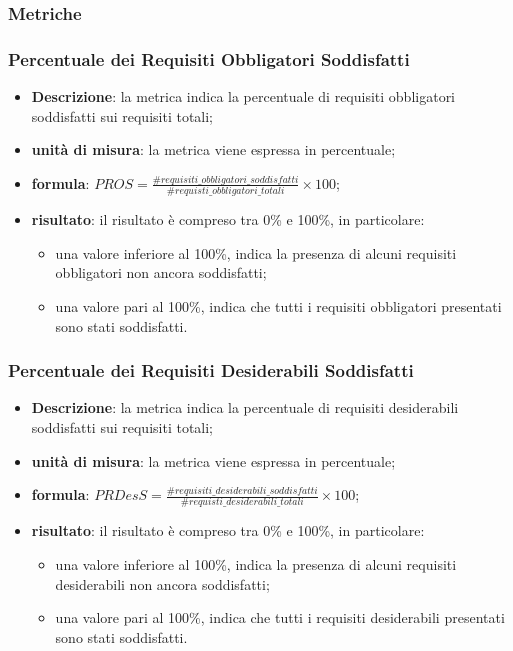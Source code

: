 \subsubsection{Metriche}
		\subsubsection*{Percentuale dei Requisiti Obbligatori Soddisfatti}
			\begin{itemize}
				\item{\textbf{Descrizione}}: la metrica indica la percentuale di requisiti obbligatori soddisfatti sui requisiti totali;
				\item{\textbf{unità di misura}}: la metrica viene espressa in percentuale;
				\item{\textbf{formula}}: $ PROS = \displaystyle\frac{\#requisiti\_obbligatori\_soddisfatti}{\#requisti\_obbligatori\_totali}\times100$;
				\item{\textbf{risultato}}: il risultato è compreso tra 0\% e 100\%, in particolare:
					\begin{itemize}
						\item una valore inferiore al 100\%, indica la presenza di alcuni requisiti obbligatori non ancora soddisfatti;
						\item una valore pari al 100\%, indica che tutti i requisiti obbligatori presentati sono stati soddisfatti.
					\end{itemize}
			\end{itemize}
		
		\subsubsection*{Percentuale dei Requisiti Desiderabili Soddisfatti}
			\begin{itemize}
				\item{\textbf{Descrizione}}: la metrica indica la percentuale di requisiti desiderabili soddisfatti sui requisiti totali;
				\item{\textbf{unità di misura}}: la metrica viene espressa in percentuale;
				\item{\textbf{formula}}: $ PRDesS = \displaystyle\frac{\#requisiti\_desiderabili\_soddisfatti}{\#requisti\_desiderabili\_totali}\times100$;
				\item{\textbf{risultato}}: il risultato è compreso tra 0\% e 100\%, in particolare:
				\begin{itemize}
					\item una valore inferiore al 100\%, indica la presenza di alcuni requisiti desiderabili non ancora soddisfatti;
					\item una valore pari al 100\%, indica che tutti i requisiti desiderabili presentati sono stati soddisfatti.
				\end{itemize}
			\end{itemize}
		
